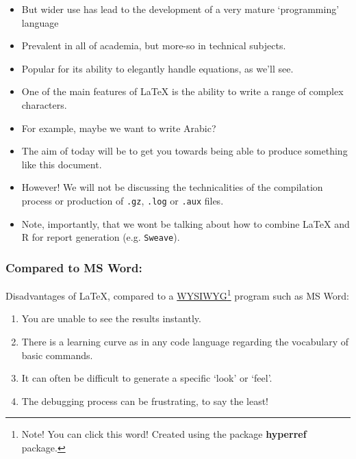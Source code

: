 \documentclass[a4paper, 12pt]{article}
\begin{document}
 \begin{itemize}
\item But wider use has lead to the development of a very mature `programming' language
\item Prevalent in all of academia, but more-so in technical subjects.
\item Popular for its ability to elegantly handle equations, as we'll see.
\item One of the main features of \LaTeX{} is the ability to write a range of complex characters.
\item For example, maybe we want to write Arabic?
\begin{center}
\end{center}

\item The aim of today will be to get you towards being able to produce something like this document.
\item However! We will not be discussing the technicalities of the compilation process or production of \texttt{.gz}, \texttt{.log} or \texttt{.aux} files.
\item Note, importantly, that we wont be talking about how to combine LaTeX and R for report generation (e.g. \texttt{Sweave}).
\end{itemize}

\subsubsection{Compared to MS Word:}

\frownie{} Disadvantages of \LaTeX{}, compared to a \color{red} \href{http://en.wikipedia.org/wiki/WYSIWYG}{WYSIWYG}\footnote{Note! You can click this word! Created using the package \small \textbf{hyperref} \normalsize package.} \color{black} program such as MS Word:
\begin{enumerate}							%
\item You are unable to see the results instantly.
\item There is a learning curve as in any code language regarding the vocabulary of basic commands.
\item It can often be difficult to generate a specific `look' or `feel'.
\item The debugging process can be frustrating, to say the least!
\end{enumerate}
\end{document}
